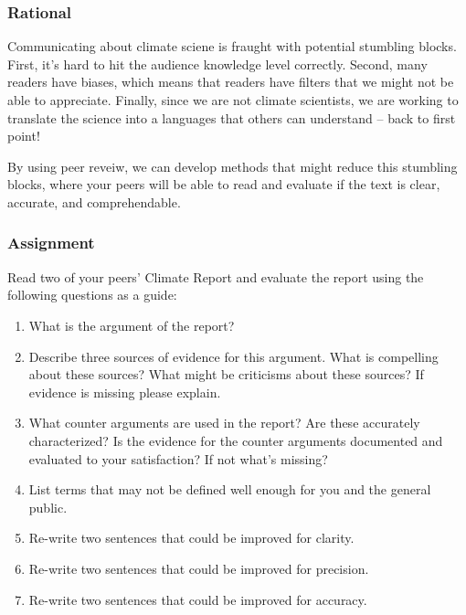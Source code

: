 
\subsubsection{Rational}

Communicating about climate sciene is fraught with potential stumbling blocks. First, it's hard to hit the audience knowledge level correctly. Second, many readers have biases, which means that readers have filters that we might not be able to appreciate. Finally, since we are not climate scientists, we are working to translate the science into a languages that others can understand -- back to first point!  

By using peer reveiw, we can develop methods that might reduce this stumbling blocks, where your peers will be able to read and evaluate if the text is clear, accurate, and comprehendable. 

\subsubsection{Assignment}

Read two of your peers' Climate Report and evaluate the report using the following questions as a guide:

\begin{enumerate}
  \item What is the argument of the report?
  \item Describe three sources of evidence for this argument. What is compelling about these sources? What might be criticisms about these sources? If evidence is missing please explain.
  \item What counter arguments are used in the report? Are these accurately characterized? Is the evidence for the counter arguments documented and evaluated to your satisfaction?  If not what's missing?
  \item List terms that may not be defined well enough for you and the general public. 
  \item Re-write two sentences that could be improved for clarity.
  \item Re-write two sentences that could be improved for precision.
  \item Re-write two sentences that could be improved for accuracy.
\end{enumerate}


